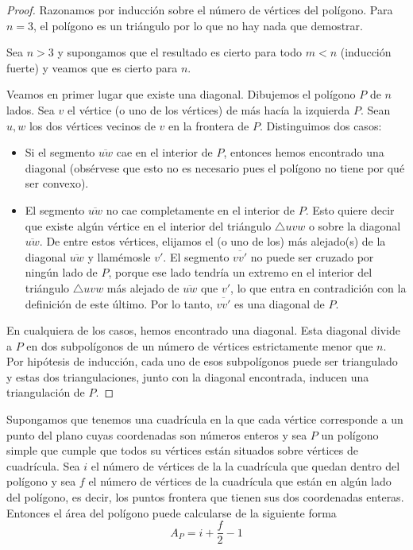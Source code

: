 \documentclass[a4paper,12pt]{article}
\begin{document}
\begin{proof}
    Razonamos por inducción sobre el número de vértices del polígono. Para $n=3$, el polígono es un triángulo por lo que no hay nada que demostrar.

    Sea $n>3$ y supongamos que el resultado es cierto para todo $m<n$ (inducción fuerte) y veamos que es cierto para $n$.

    Veamos en primer lugar que existe una diagonal. Dibujemos el polígono $P$ de $n$ lados. Sea $v$ el vértice (o uno de los vértices) de más hacía la izquierda $P$. Sean $u,w$ los dos vértices vecinos de $v$ en la frontera de $P$. Distinguimos dos casos:
    \begin{itemize}
        \item Si el segmento $\overline{uw}$ cae en el interior de $P$, entonces hemos encontrado una diagonal (obsérvese que esto no es necesario pues el polígono no tiene por qué ser convexo). 
        \item El segmento $\overline{uw}$ no cae completamente en el interior de $P$. Esto quiere decir que existe algún vértice en el interior del triángulo $\triangle uvw$ o sobre la diagonal $\overline{uw}$. De entre estos vértices, elijamos el (o uno de los) más alejado(s) de la diagonal $\overline{uw}$ y llamémosle $v'$. El segmento $\overline{vv'}$ no puede ser cruzado por ningún lado de $P$, porque ese lado tendría un extremo en el interior del triángulo $\triangle uvw$ más alejado de $\overline{uw}$ que $v'$, lo que entra en contradición con la definición de este último. Por lo tanto, $\overline{vv'}$ es una diagonal de $P$.
    \end{itemize}

    En cualquiera de los casos, hemos encontrado una diagonal. Esta diagonal divide a $P$ en dos subpolígonos de un número de vértices estrictamente menor que $n$. Por hipótesis de inducción, cada uno de esos subpolígonos puede ser triangulado y estas dos triangulaciones, junto con la diagonal encontrada, inducen una triangulación de $P$.
\end{proof}


\begin{teo}
    Supongamos que tenemos una cuadrícula en la que cada vértice corresponde a un punto del plano cuyas coordenadas son números enteros y sea $P$ un polígono simple que cumple que todos su vértices están situados sobre vértices de cuadrícula. Sea $i$ el número de vértices de la la cuadrícula que quedan dentro del polígono y sea $f$ el número de vértices de la cuadrícula que están en algún lado del polígono, es decir, los puntos frontera que tienen sus dos coordenadas enteras. Entonces el área del polígono puede calcularse de la siguiente forma
    $$A_P=i+\frac{f}{2}-1$$
\end{teo}
\end{document}
